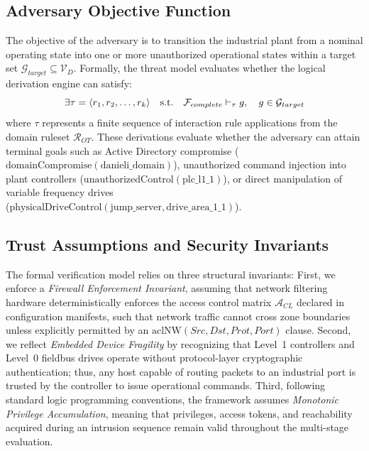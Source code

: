 \documentclass[target=mst,aauheader=aics,style=]{thud}
\begin{document}
\subsection{Adversary Objective Function}
The objective of the adversary is to transition the industrial plant from a nominal operating state into one or more unauthorized operational states within a target set $\mathcal{G}_{target} \subseteq \mathcal{V}_D$. Formally, the threat model evaluates whether the logical derivation engine can satisfy:
\begin{equation}
\centering
    \exists \tau = \langle r_1, r_2, \dots, r_k \rangle \quad \text{s.t.} \quad \mathcal{F}_{complete} \vdash_{\tau} g, \quad g \in \mathcal{G}_{target}
\end{equation}
where $\tau$ represents a finite sequence of interaction rule applications from the domain ruleset $\mathcal{R}_{OT}$. These derivations evaluate whether the adversary can attain terminal goals such as Active Directory compromise ($\text{domainCompromise}(\text{danieli\_domain})$), unauthorized command injection into plant controllers ($\text{unauthorizedControl}(\text{plc\_l1\_1})$), or direct manipulation of variable frequency drives \\($\text{physicalDriveControl}(\text{jump\_server}, \text{drive\_area\_1\_1})$).

\subsection{Trust Assumptions and Security Invariants}
The formal verification model relies on three structural invariants:
First, we enforce a \textit{Firewall Enforcement Invariant}, assuming that network filtering hardware deterministically enforces the access control matrix $\mathcal{A}_{CL}$ declared in configuration manifests, such that network traffic cannot cross zone boundaries unless explicitly permitted by an $\text{aclNW}(Src, Dst, Prot, Port)$ clause. 
Second, we reflect \textit{Embedded Device Fragility} by recognizing that Level~1 controllers and Level~0 fieldbus drives operate without protocol-layer cryptographic authentication; thus, any host capable of routing packets to an industrial port is trusted by the controller to issue operational commands. 
Third, following standard logic programming conventions, the framework assumes \textit{Monotonic Privilege Accumulation}, meaning that privileges, access tokens, and reachability acquired during an intrusion sequence remain valid throughout the multi-stage evaluation.
\end{document}
